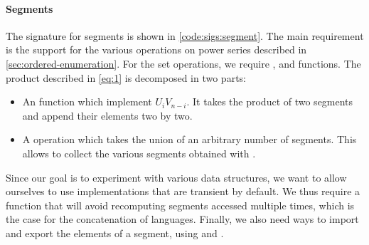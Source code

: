 \paragraph{Segments}

The signature for segments is shown in \autoref{code:sigs:segment}.
The main requirement is the support for the various operations on power series described in
\autoref{sec:ordered-enumeration}.
For the set operations, we require
,  and  functions.
%
The product described in \autoref{eq:1} is decomposed in two parts:
\begin{itemize}
\item  An  function which implement $U_i V_{n-i}$. It takes the
  product of two segments and append their elements two by two.
\item A  operation which takes the union of an arbitrary number
  of segments. This allows to collect the various segments obtained
  with .
\end{itemize}
%
Since our goal is to experiment with various data structures, we want to allow
ourselves to use implementations that are transient by default. We thus require
a  function that will avoid recomputing segments accessed multiple times, which is the case for the concatenation of languages.
%
Finally, we also need ways to import and export the elements of a segment, using  and .


